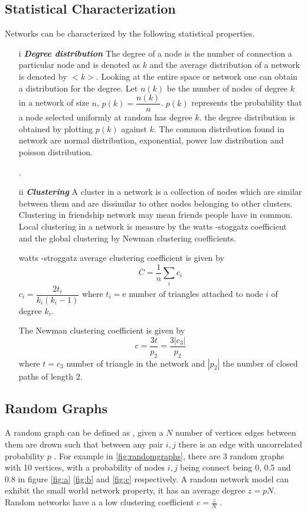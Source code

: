  \subsection{Statistical Characterization}
 
 Networks can be characterized by the following statistical properties.
 \begin{itemize}
 \item[i] \textit{\textbf{Degree distribution}}
 The degree of a node is the number of connection a particular node  and is denoted as $k$  and the average distribution of a network is denoted by $<k>$. Looking at the entire space or network one can obtain a distribution for the degree. Let $n(k)$ be the number of nodes of degree $k$  in a network of size $n$, $p(k) = \dfrac{n(k)}{n}$. $p(k)$ represents the probability that a node selected uniformly at random  has degree $k$. the degree distribution is obtained by plotting $p(k)$ against $k$\citep{estrada2015first}. The common distribution found in network are normal distribution, exponential, power law distribution and poisson distribution.
 
   \citep{chung2002average}.
 \item[ii] \textit{\textbf{Clustering }}
 A cluster in a network  is a collection of nodes which are similar between them and are dissimilar to other nodes belonging to other clusters. Clustering in friendship network may mean friends people have in common. Local clustering in a network is measure by   the watts -stoggatz  coefficient and the global clustering by  Newman clustering coefficients.
 
 watts -stroggatz average clustering coefficient is given by 
 \begin{equation}
 \overline{C} = \dfrac{1}{n} \sum_i c_i
 \end{equation}
  $c_i = \dfrac{2t_i}{k_i(k_i-1)}$ where $t_i =$e number of triangles attached to node $i$ of degree $k_i$.
 
 The Newman clustering coefficient is given by
 \begin{equation}
 c = \frac{3t}{p_2} =\dfrac{3|c_3|}{p_2}
 \end{equation}
 where $t = c_3$ number of triangle in the network and $|p_2|$ the number of closed paths of length 2. 
 \end{itemize}
 \subsection{Random Graphs} A random graph can be defined as , given a $N$ number of vertices edges between them are drown such that between any pair $i,j$ there is an edge with uncorrelated probability $p$ \citep{newman2002random}. For example in \ref{fig:randomgraphs}, there are 3 random graphs with 10 vertices, with a probability of nodes $i,j$ being connect being 0, 0.5 and 0.8 in figure \ref{fig:a} \ref{fig:b} and \ref{fig:c} respectively. A random network model can exhibit the small world network property, it has an average degree $z= pN$. Random networks have a a low clustering coefficient $ c = \frac{z}{N}$ \citep{newman2003structure}.


